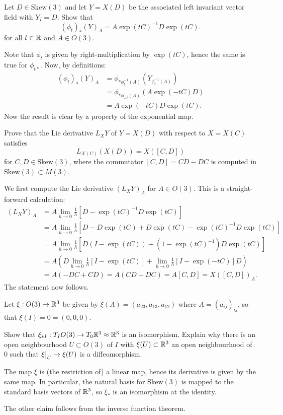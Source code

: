 \documentclass[11pt, english]{article}
\begin{document}
\begin{exc}
Let $D \in \mathrm{Skew}(3)$ and let $Y=X(D)$ be the associated left invariant vector field with $Y_I=D$. Show that
\[
(\phi_t)_\ast(Y)_A = A \exp(tC)^{-1}D \exp(tC).
\]  
for all $t\in \mathbb{R}$ and $A \in O(3)$.
\end{exc}
\begin{sol}
Note that $\phi_t$ is given by right-multiplication by $\exp(tC)$, hence the same is true for $\phi_{t\ast}$. Now, by definitions:
\begin{align*}
  (\phi_t)_\ast(Y)_A &= \phi_{\ast \phi_t^{-1}(A)}(Y_{\phi_t^{-1}(A)}) \\
&= \phi_{\ast \phi_{-t}(A)}(A\exp(-tC)D) \\
&= A\exp(-tC)D \exp(tC).
\end{align*}
Now the result is clear by a property of the exponential map.
\end{sol}


\begin{exc}
  Prove that the Lie derivative $L_XY$ of $Y=X(D)$ with respect to $X=X(C)$ satisfies
\[
L_{X(C)}(X(D)) = X([C,D])
\]
for $C,D \in \mathrm{Skew}(3)$, where the commutator $[C,D]=CD-DC$ is computed in $\mathrm{Skew}(3) \subset M(3)$. 
\end{exc}
\begin{sol}
We first compute the Lie derivative $(L_XY)_A$ for $A \in O(3)$. This is a straight-forward calculation:
\begin{align*}
 (L_XY)_A &=A \lim_{h \to 0} \frac 1h \left[ D - \exp(tC)^{-1}D\exp(tC)\right] \\
&=A \lim_{h \to 0} \frac 1h \left[ D - D\exp(tC) + D\exp(tC)-\exp(tC)^{-1}D\exp(tC) \right] \\
&=A \lim_{h \to 0} \frac 1h \left[ D(I-\exp(tC)) + (1-\exp(tC)^{-1})D\exp(tC)\right] \\
&=A \left(D \lim_{h \to 0}\frac 1h  \left[ I- \exp(tC) \right] + \lim_{h \to 0} \frac 1h \left[I - \exp(-tC)\right] D\right) \\
&=A( -DC + CD) =A( CD-DC) = A[C,D] = X([C,D])_A.
\end{align*}
The statement now follows.
\end{sol}

Let $\xi:O(3) \to \mathbb{R}^3$ be given by $\xi(A)= (a_{23},a_{13},a_{12})$ where $A=(a_{ij})_{ij}$, so that $\xi(I)=0=(0,0,0)$.
\begin{exc}
  Show that $\xi_{\ast I}: T_IO(3) \to T_0\mathbb{R}^3 \approx \mathbb{R}^3$ is an isomorphism. Explain why there is an open neighbourhood $U \subset O(3)$ of $I$ with $\xi(U) \subset \mathbb{R}^3$ an open neighbourhood of $0$ such that $\restr{\xi}{U} \to \xi(U)$ is a diffeomorphism.
\end{exc}
\begin{sol}
The map $\xi$ is (the restriction of) a linear map, hence its derivative is given by the same map. In particular, the natural basis for $\mathrm{Skew}(3)$ is mapped to the standard basis vectors of $\mathbb{R}^3$, so $\xi_\ast$ is an isomorphism at the identity.

The other claim follows from the inverse function theorem.
\end{sol}
\end{document}
